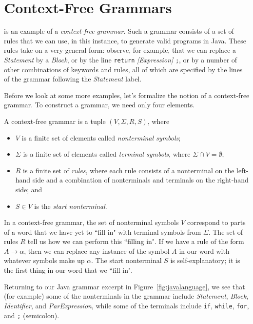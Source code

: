 \section{Context-Free Grammars}\label{sec:contextfreegrammars}

 is an example of a \emph{context-free grammar}. Such a grammar consists of a set of rules that we can use, in this instance, to generate valid programs in Java. These rules take on a very general form: observe, for example, that we can replace a \textit{Statement} by a \textit{Block}, or by the line \texttt{return} \textit{[Expression]} \texttt{;}, or by a number of other combinations of keywords and rules, all of which are specified by the lines of the grammar following the \textit{Statement} label.

Before we look at some more examples, let's formalize the notion of a context-free grammar. To construct a grammar, we need only four elements.

\begin{definition}\label{def:contextfreegrammar}
A context-free grammar is a tuple $(V, \Sigma, R, S)$, where
\begin{itemize}
\item $V$ is a finite set of elements called \emph{nonterminal symbols};
\item $\Sigma$ is a finite set of elements called \emph{terminal symbols}, where $\Sigma \cap V = \emptyset$;
\item $R$ is a finite set of \emph{rules}, where each rule consists of a nonterminal on the left-hand side and a combination of nonterminals and terminals on the right-hand side; and
\item $S \in V$ is the \emph{start nonterminal}.
\end{itemize}
\end{definition}

In a context-free grammar, the set of nonterminal symbols $V$ correspond to parts of a word that we have yet to ``fill in" with terminal symbols from $\Sigma$. The set of rules $R$ tell us how we can perform this ``filling in". If we have a rule of the form $A \rightarrow \alpha$, then we can replace any instance of the symbol $A$ in our word with whatever symbols make up $\alpha$. The start nonterminal $S$ is self-explanatory; it is the first thing in our word that we ``fill in".

Returning to our Java grammar excerpt in Figure~\ref{fig:javalanguage}, we see that (for example) some of the nonterminals in the grammar include \textit{Statement}, \textit{Block}, \textit{Identifier}, and \textit{ParExpression}, while some of the terminals include \texttt{if}, \texttt{while}, \texttt{for}, and \texttt{;} (semicolon).

